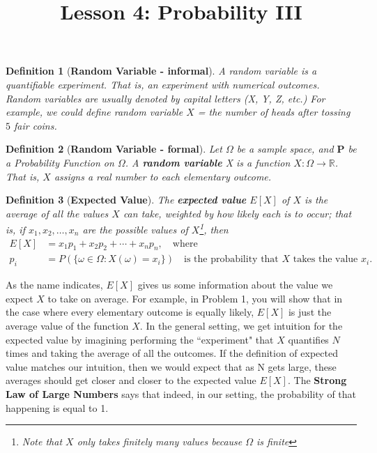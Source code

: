 \documentclass[a4paper,12pt]{article}
\title{Lesson 4: Probability III}
\theoremstyle{perfect}
\newtheorem{dfn}{Definition}
\newcommand{\R}{\mathbb{R}}
\newcommand{\PP}{\mathbf{P}}
\begin{document}
 
\maketitle


\begin{dfn}[\textbf{Random Variable - informal}]
A random variable is a quantifiable experiment. That
is, an experiment with numerical outcomes. 
Random variables are usually denoted by capital letters (X, Y, Z, etc.)
For example, we could define random variable $X$ = the number of heads
after tossing $5$ fair coins.
\end{dfn}


\begin{dfn}[\textbf{Random Variable - formal}]
Let $\Omega$ be a sample space, and $\PP$ be a Probability Function on $\Omega$. A \textbf{random variable} X is a function $X : \Omega \to \R$. That is, $X$ assigns a real number to each elementary outcome.
\end{dfn}

\begin{dfn}[\textbf{Expected Value}]
The {\bf expected value} $E[X]$ of $X$ is the average of all the values $X$ can take, weighted by how likely each is to occur; that is, if $x_1, x_2, \dots, x_n$ are the possible values of $X$\footnote{Note that $X$ only takes finitely many values because $\Omega$ is finite}, then  
\begin{align*}
E[X] &= x_1p_1 + x_2p_2 + \cdots + x_np_n, \quad\text{where}\quad \\
p_i &= P(\{\omega \in \Omega : X(\omega) = x_i\}) \quad\text{is the probability that $X$ takes the value $x_i$}.
\end{align*}
\end{dfn}

\noindent
As the name indicates, $E[X]$ gives us some information about the value we expect $X$ to take on average. For example, in Problem 1, you will show that in the case where every elementary outcome is equally likely, $E[X]$ is just the average value of the function $X$. In the general setting, we get intuition for the expected value by imagining performing the ``experiment" that $X$ quantifies $N$ times and taking the average of all the outcomes. If the definition of expected value matches our intuition, then we would expect that as N gets large, these averages should get closer and closer to the expected value $E[X]$. The {\bf Strong Law of Large Numbers} says that indeed, in our setting, the probability of that happening is equal to 1. 
\end{document}
